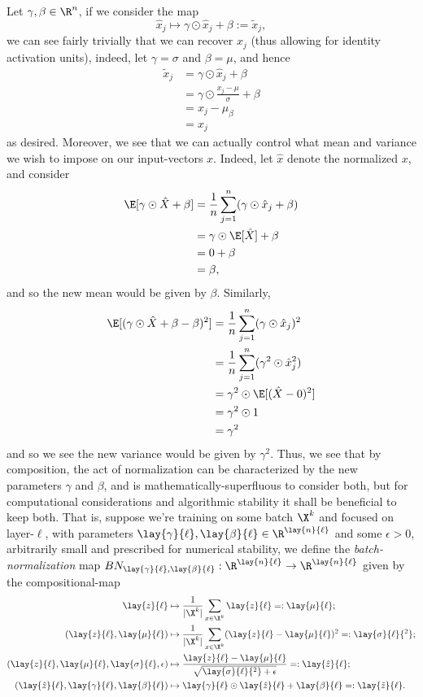 Let $\gamma,\beta\in\R^n$, if we consider the map
$$\hat{x}_j\mapsto\gamma\odot\hat{x}_j+\beta:=\tilde{x}_j,$$
we can see fairly trivially that we can recover $x_j$ (thus allowing for identity activation units), indeed, let $\gamma=\sigma$ and $\beta=\mu$, and hence
\begin{align*}
	\tilde{x}_j&=\gamma\odot\hat{x}_j+\beta\\
	&=\gamma\odot\frac{x_j-\mu}{\sigma}+\beta\\
	&=x_j-\mu_\beta\\
	&=x_j
\end{align*}
as desired.  Moreover, we see that we can actually control what mean and variance we wish to impose on our input-vectors $x$.  Indeed, let $\hat{x}$ denote the normalized $x$, and consider
\begin{align*}
	\E[\gamma\odot \hat{X}+\beta]&=\frac{1}{n}\sum_{j=1}^n(\gamma\odot \hat{x}_j+\beta)\\
	&=\gamma\odot\E[\hat{X}]+\beta\\
	&=0+\beta\\
	&=\beta,
\end{align*}
and so the new mean would be given by $\beta$.  Similarly,
\begin{align*}
	\E[(\gamma\odot \hat{X}+\beta-\beta)^2]&=\frac{1}{n}\sum_{j=1}^n(\gamma\odot \hat{x}_j)^2\\
	&=\frac{1}{n}\sum_{j=1}^n(\gamma^2\odot \hat{x}_j^2)\\
	&=\gamma^2\odot\E[(\hat{X}-0)^2]\\
	&=\gamma^2\odot1\\
	&=\gamma^2
\end{align*}
and so we see the new variance would be given by $\gamma^2$.  Thus, we see that by composition, the act of normalization can be characterized by the new parameters $\gamma$ and $\beta$, and is mathematically-superfluous to consider both, but for computational considerations and algorithmic stability it shall be beneficial to keep both.  That is, suppose we're training on some batch $\X^k$ and focused on layer-$\ell$, with parameters $\lay{\gamma}{\ell},\lay{\beta}{\ell}\in\R^{\lay{n}{\ell}}$ and some $\epsilon>0$, arbitrarily small and prescribed for numerical stability, we define the \textit{batch-normalization} map $BN_{\lay{\gamma}{\ell},\lay{\beta}{\ell}}:\R^{\lay{n}{\ell}}\to\R^{\lay{n}{\ell}}$ given by the compositional-map
\begin{align*}
	\lay{z}{\ell}&\mapsto\frac{1}{|\X^k|}\sum_{x\in\X^k}\lay{z}{\ell}=:\lay{\mu}{\ell};\\
	(\lay{z}{\ell},\lay{\mu}{\ell})&\mapsto\frac{1}{|\X^k|}\sum_{x\in\X^k}(\lay{z}{\ell}-\lay{\mu}{\ell})^2=:\lay{\sigma}{\ell}{^2};\\
	(\lay{z}{\ell},\lay{\mu}{\ell},\lay{\sigma}{\ell},\epsilon)&\mapsto\frac{\lay{z}{\ell}-\lay{\mu}{\ell}}{\sqrt{\lay{\sigma}{\ell}{^2}+\epsilon}}=:\lay{\hat{z}}{\ell};\\
	(\lay{\hat{z}}{\ell},\lay{\gamma}{\ell},\lay{\beta}{\ell})&\mapsto \lay{\gamma}{\ell}\odot\lay{\hat{z}}{\ell}+\lay{\beta}{\ell}=:\lay{\tilde{z}}{\ell}.
\end{align*}


